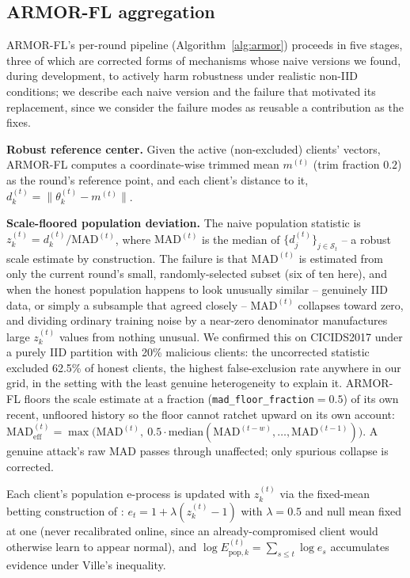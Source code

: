 \documentclass[pdflatex,iicol,sn-mathphys-num]{sn-jnl}%
\theoremstyle{thmstyleone}%
\theoremstyle{thmstyletwo}%
\theoremstyle{thmstylethree}%
\begin{document}
\subsection{ARMOR-FL aggregation}

ARMOR-FL's per-round pipeline (Algorithm~\ref{alg:armor}) proceeds in five stages, three of which are corrected forms of mechanisms whose naive versions we found, during development, to actively harm robustness under realistic non-IID conditions; we describe each naive version and the failure that motivated its replacement, since we consider the failure modes as reusable a contribution as the fixes.

\textbf{Robust reference center.} Given the active (non-excluded) clients' vectors, ARMOR-FL computes a coordinate-wise trimmed mean $m^{(t)}$ (trim fraction $0.2$) as the round's reference point, and each client's distance to it, $d_k^{(t)} = \lVert \theta_k^{(t)} - m^{(t)} \rVert$.

\textbf{Scale-floored population deviation.} The naive population statistic is $z_k^{(t)} = d_k^{(t)} / \mathrm{MAD}^{(t)}$, where $\mathrm{MAD}^{(t)}$ is the median of $\{d_j^{(t)}\}_{j \in \mathcal{S}_t}$ -- a robust scale estimate by construction. The failure is that $\mathrm{MAD}^{(t)}$ is estimated from only the current round's small, randomly-selected subset (six of ten here), and when the honest population happens to look unusually similar -- genuinely IID data, or simply a subsample that agreed closely -- $\mathrm{MAD}^{(t)}$ collapses toward zero, and dividing ordinary training noise by a near-zero denominator manufactures large $z_k^{(t)}$ values from nothing unusual. We confirmed this on CICIDS2017 under a purely IID partition with 20\% malicious clients: the uncorrected statistic excluded 62.5\% of honest clients, the highest false-exclusion rate anywhere in our grid, in the setting with the least genuine heterogeneity to explain it. ARMOR-FL floors the scale estimate at a fraction (\texttt{mad\_floor\_fraction}$=0.5$) of its own recent, unfloored history so the floor cannot ratchet upward on its own account: $\mathrm{MAD}^{(t)}_{\mathrm{eff}} = \max\bigl(\mathrm{MAD}^{(t)},\ 0.5 \cdot \mathrm{median}(\mathrm{MAD}^{(t-w)},\dots,\mathrm{MAD}^{(t-1)})\bigr)$. A genuine attack's raw MAD passes through unaffected; only spurious collapse is corrected.

Each client's population e-process is updated with $z_k^{(t)}$ via the fixed-mean betting construction of \citep{waudbysmith2020betting}: $e_t = 1 + \lambda(z_k^{(t)} - 1)$ with $\lambda = 0.5$ and null mean fixed at one (never recalibrated online, since an already-compromised client would otherwise learn to appear normal), and $\log E_{\mathrm{pop},k}^{(t)} = \sum_{s\le t} \log e_s$ accumulates evidence under Ville's inequality.
\end{document}
